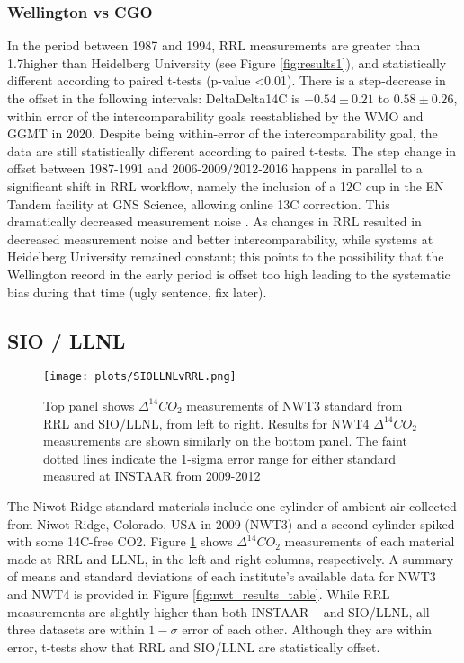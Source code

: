 \subsubsection{Wellington vs CGO}
\label{WellingtonvCGO}
In the period between 1987 and 1994, RRL measurements are  greater than 1.7\textperthousand higher than Heidelberg University (see Figure \ref{fig:results1}), and statistically different according to paired t-tests (p-value <0.01). 
There is a step-decrease in the offset in the following intervals: DeltaDelta14C is $-0.54\pm0.21$ to $0.58\pm0.26$, within error of the intercomparability goals reestablished by the WMO and GGMT in 2020. Despite being within-error of the intercomparability goal, the data are still statistically different according to paired t-tests. 
The step change in offset between 1987-1991 and 2006-2009/2012-2016 happens in parallel to a significant shift in RRL workflow, namely the inclusion of a 12C cup in the EN Tandem facility at GNS Science, allowing online 13C correction. This dramatically decreased measurement noise \cite{turnbull2017}.
As changes in RRL resulted in decreased measurement noise and better intercomparability, while systems at Heidelberg University remained constant; this points to the possibility that the Wellington record in the early period is offset too high leading to the systematic bias during that time (ugly sentence, fix later). 


\subsection{SIO / LLNL}
\begin{figure}[h!]
  \texttt{[image: plots/SIOLLNLvRRL.png]}
  \caption{Top panel shows ${\Delta^{14}CO_{2}}$ measurements of NWT3 standard from RRL and SIO/LLNL, from left to right. Results for NWT4 ${\Delta^{14}CO_{2}}$ measurements are shown similarly on the bottom panel. The faint dotted lines indicate the 1-sigma error range for either standard measured at INSTAAR from 2009-2012 ~\cite{lehman2013allocation}}
  \label{fig:siollnl}
\end{figure}

The Niwot Ridge standard materials include one cylinder of ambient air collected from Niwot Ridge, Colorado, USA in 2009 (NWT3) and a second cylinder spiked with some 14C-free CO2. Figure \ref{fig:siollnl} shows ${\Delta^{14}CO_{2}}$ measurements of each material made at RRL and LLNL, in the left and right columns, respectively. A summary of means and standard deviations of each institute's available data for NWT3 and NWT4 is provided in Figure \ref{fig:nwt_results_table}.
While RRL measurements are slightly higher than both INSTAAR ~\cite{lehman2013allocation} and SIO/LLNL, all three datasets are within $1-\sigma$ error of each other. Although they are within error, t-tests show that RRL and SIO/LLNL are statistically offset. 


